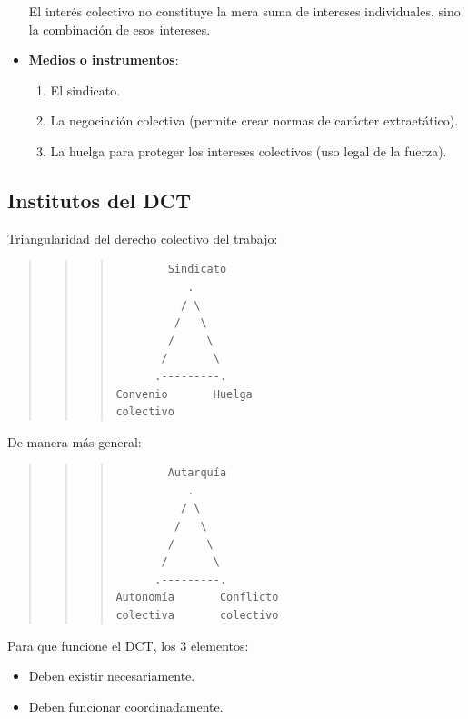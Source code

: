 \documentclass[spanish,12pt,a4paper,titlepage]{report}
\begin{document}
\begin{itemize}
\begin{itemize}
  \end{itemize}
  El interés colectivo no constituye la mera suma de intereses individuales, sino la combinación de esos intereses.
\item \textbf{Medios o instrumentos}:
  \begin{enumerate}
  \item El sindicato.
  \item La negociación colectiva (permite crear normas de carácter extraetático).
  \item La huelga para proteger los intereses colectivos (uso legal de la fuerza).
  \end{enumerate}
\end{itemize}

\subsection{Institutos del DCT}
\label{sec:institutos-del-dct}

Triangularidad del derecho colectivo del trabajo:

\begin{quote}
\begin{quote}
\begin{quote}
\begin{verbatim}
        Sindicato
           .
          / \
         /   \
        /     \
       /       \
      .---------.
Convenio       Huelga
colectivo
\end{verbatim}
\end{quote}
\end{quote}
\end{quote}

De manera más general:
\begin{quote}
\begin{quote}
\begin{quote}
\begin{verbatim}
        Autarquía
           .
          / \
         /   \
        /     \
       /       \
      .---------.
Autonomía       Conflicto
colectiva       colectivo
\end{verbatim}
\end{quote}
\end{quote}
\end{quote}

Para que funcione el DCT, los 3 elementos:
\begin{itemize}
\item Deben existir necesariamente.
\item Deben funcionar coordinadamente.
\end{itemize}
\end{document}
